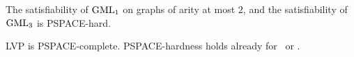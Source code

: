 \begin{lemma}
The satisfiability of $\text{GML}_1$ on graphs of arity at most $2$, and the satisfiability of $\text{GML}_3$ is PSPACE-hard.
\label{lemma:GMLonegrapharitytwo}
\label{lemma:GMLthree}
\end{lemma}





 
 

\begin{theorem}
    LVP is PSPACE-complete. PSPACE-hardness holds already for \casezerotwoatwo\ or \caseminustwothree.
    \label{theorem:LVPPSPACEcomplete}
\end{theorem}

